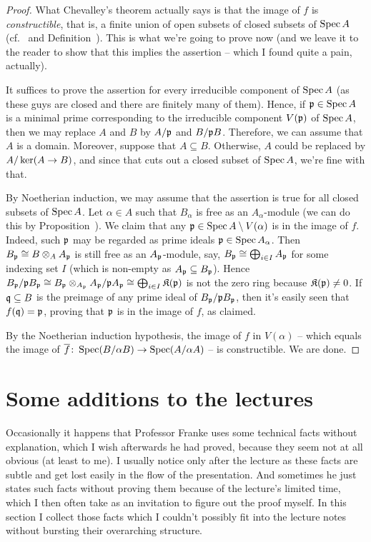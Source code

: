 \documentclass[a4paper,parskip=half,numbers=enddot, DIV=12]{scrreprt}
\begin{document}
\begin{proof}
	What Chevalley's theorem actually says is that the image of $f$ is \emph{constructible}, that is, a finite union of open subsets of closed subsets of $\operatorname{Spec} A$ (cf.\ \cite[Corollary~14.6]{eisenbudCommAlg} and Definition~). This is what we're going to prove now (and we leave it to the reader to show that this implies the assertion -- which I found quite a pain, actually).
	
	It suffices to prove the assertion for every irreducible component of $\operatorname{Spec} A$ (as these guys are closed and there are finitely many of them). Hence, if $\mathfrak{p}\in\operatorname{Spec} A$ is a minimal prime corresponding to the irreducible component $V(\mathfrak{p})$ of $\operatorname{Spec} A$, then we may replace $A$ and $B$ by $A/\mathfrak{p}$ and $B/\mathfrak{p} B$. Therefore, we can assume that $A$ is a domain. Moreover, suppose that $A\subseteq B$. Otherwise, $A$ could be replaced by $A/\ker(A\morphism B)$, and since that cuts out a closed subset of $\operatorname{Spec} A$, we're fine with that. 
	
	By Noetherian induction, we may assume that the assertion is true for all closed subsets of $\operatorname{Spec} A$. Let $\alpha\in A$ such that $B_\alpha$ is free as an $A_\alpha$-module (we can do this by Proposition~). We claim that any $\mathfrak{p}\in\operatorname{Spec} A\setminus V(\alpha)$ is in the image of $f$. Indeed, such $\mathfrak{p}$ may be regarded as prime ideals $\mathfrak{p}\in\operatorname{Spec} A_\alpha$. Then $B_{\mathfrak{p}}\cong B\otimes_AA_{\mathfrak{p}}$ is still free as an $A_{\mathfrak{p}}$-module, say, $B_{\mathfrak{p}}\cong \bigoplus_{i\in I}A_{\mathfrak{p}}$ for some indexing set $I$ (which is non-empty as $A_{\mathfrak{p}}\subseteq B_{\mathfrak{p}}$). Hence $B_{\mathfrak{p}}/\mathfrak{p} B_{\mathfrak{p}}\cong B_{\mathfrak{p}}\otimes_{A_{\mathfrak{p}}}A_{\mathfrak{p}}/\mathfrak{p} A_{\mathfrak{p}}\cong \bigoplus_{i\in I}\mathfrak{K}(\mathfrak{p})$ is not the zero ring because $\mathfrak{K}(\mathfrak{p})\neq 0$. If $\mathfrak{q}\subseteq B$ is the preimage of any prime ideal of $B_{\mathfrak{p}}/\mathfrak{p} B_{\mathfrak{p}}$, then it's easily seen that $f(\mathfrak{q})=\mathfrak{p}$, proving that $\mathfrak{p}$ is in the image of $f$, as claimed.
	
	By the Noetherian induction hypothesis, the image of $f$ in $V(\alpha)$ -- which equals the image of $\ov{f}\colon\Spec(B/\alpha B)\morphism\Spec (A/\alpha A)$ -- is constructible. We are done.		
\end{proof}
\section{Some additions to the lectures}
Occasionally it happens that Professor Franke uses some technical facts without explanation, which I wish afterwards he had proved, because they seem not at all obvious (at least to me). I usually notice only after the lecture as these facts are subtle and get lost easily in the flow of the presentation. And sometimes he just states such facts without proving them because of the lecture's limited time, which I then often take as an invitation to figure out the proof myself. In this section I collect those facts which I couldn't possibly fit into the lecture notes without bursting their overarching structure.
\end{document}
